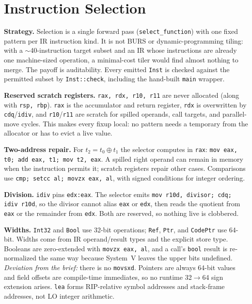 \documentclass[10pt]{article}
\newcommand{\code}[1]{\texttt{\small #1}}
\begin{document}
\section{Instruction Selection}
\textbf{Strategy.} Selection is a single forward pass (\code{select\_function}) with one fixed pattern per IR instruction kind. It is not BURS or dynamic-programming tiling: with a $\sim$40-instruction target subset and an IR whose instructions are already one machine-sized operation, a minimal-cost tiler would find almost nothing to merge. The payoff is auditability. Every emitted \code{Inst} is checked against the permitted subset by \code{Inst::check}, including the hand-built \code{main} wrapper.

\textbf{Reserved scratch registers.} \code{rax, rdx, r10, r11} are never allocated (along with \code{rsp, rbp}). \code{rax} is the accumulator and return register, \code{rdx} is overwritten by \code{cdq}/\code{idiv}, and \code{r10}/\code{r11} are scratch for spilled operands, call targets, and parallel-move cycles. This makes every fixup local: no pattern needs a temporary from the allocator or has to evict a live value.

\textbf{Two-address repair.} For $t_2 = t_0 \oplus t_1$ the selector computes in \code{rax}: \code{mov eax, t0; add eax, t1; mov t2, eax}. A spilled right operand can remain in memory when the instruction permits it; scratch registers repair other cases. Comparisons use \code{cmp; setcc al; movzx eax, al}, with signed conditions for integer ordering.

\textbf{Division.} \code{idiv} pins \code{edx:eax}. The selector emits \code{mov r10d, divisor; cdq; idiv r10d}, so the divisor cannot alias \code{eax} or \code{edx}, then reads the quotient from \code{eax} or the remainder from \code{edx}. Both are reserved, so nothing live is clobbered.

\textbf{Widths.} \code{Int32} and \code{Bool} use 32-bit operations; \code{Ref}, \code{Ptr}, and \code{CodePtr} use 64-bit. Widths come from IR operand/result types and the explicit store type. Booleans are zero-extended with \code{movzx eax, al}, and a call's \code{bool} result is re-normalized the same way because System~V leaves the upper bits undefined. \emph{Deviation from the brief:} there is no \code{movsxd}. Pointers are always 64-bit values and field offsets are compile-time immediates, so no runtime 32$\to$64 sign extension arises. \code{lea} forms RIP-relative symbol addresses and stack-frame addresses, not LO integer arithmetic.
\end{document}

